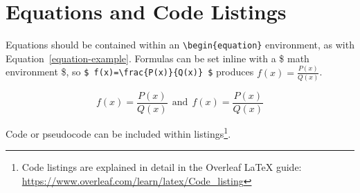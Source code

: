 \section{Equations and Code Listings}

Equations should be contained within an \texttt{\textbackslash begin\{equation\}} environment, as with Equation~\ref{equation-example}. Formulas can be set inline with a \$ math environment \$, so \texttt{\$ f(x)=\textbackslash frac\{P(x)\}\{Q(x)\} \$} produces $ f(x)=\frac{P(x)}{Q(x)} $.

\begin{equation}\label{equation-example}
  f(x)=\frac{P(x)}{Q(x)} \ \
  \textrm{and} \ \
  f(x)=\textstyle\frac{P(x)}{Q(x)}
\end{equation}

Code or pseudocode can be included within listings\footnote{Code listings are explained in detail in the Overleaf \LaTeX{} guide: \url{https://www.overleaf.com/learn/latex/Code\_listing}}.